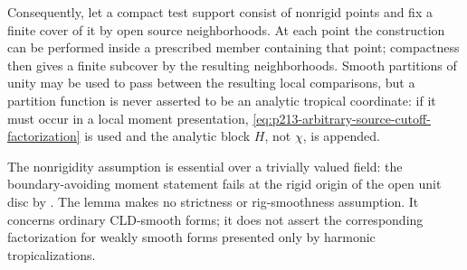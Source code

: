 \begin{lemma}
Consequently, let a compact test support consist of nonrigid points and fix
a finite cover of it by open source neighborhoods.  At each point the
construction can be
performed inside a prescribed member containing that point; compactness
then gives a finite subcover by the resulting neighborhoods.  Smooth
partitions of unity may be used to pass between the resulting local
comparisons, but a partition function is never asserted to be an analytic
tropical coordinate: if it must occur in a local moment presentation,
\eqref{eq:p213-arbitrary-source-cutoff-factorization} is used and the
analytic block $H$, not $\chi$, is appended.
\end{lemma}

\begin{remark}
\label{rem:p213-arbitrary-source-localization-scope}
The nonrigidity assumption is essential over a trivially valued field:
the boundary-avoiding moment statement fails at the rigid origin of the
open unit disc by \cite[Remark~12.3.7]{CLD25}.  The lemma makes no
strictness or rig-smoothness assumption.  It concerns ordinary CLD-smooth
forms; it does not assert the corresponding factorization for weakly
smooth forms presented only by harmonic tropicalizations.
\end{remark}
